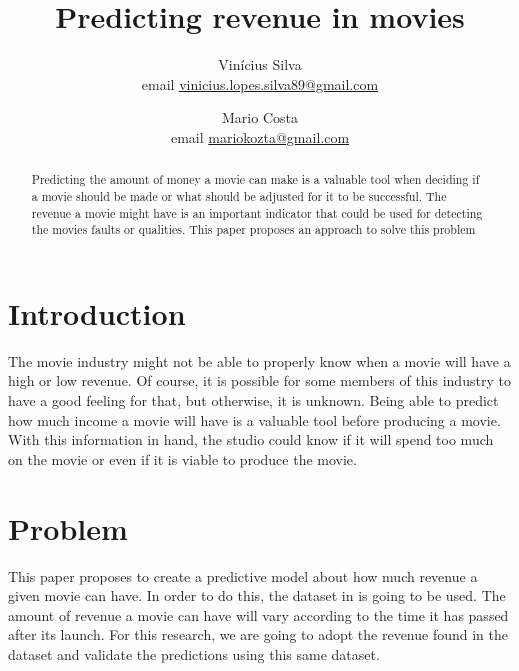 \documentclass[10pt,twocolumn,letterpaper]{article}
\begin{document}
\title{Predicting revenue in movies}
\author{Vin\'{i}cius Silva \\ email         \href{vinicius.lopes.silva89@gmail.com}{vinicius.lopes.silva89@gmail.com} 
\\ \and
Mario Costa \\ email \href{mariokozta@gmail.com}{mariokozta@gmail.com}
}

\maketitle
\begin{abstract}
Predicting the amount of money a movie can make is a valuable tool when deciding if a movie should be made or what should be adjusted for it to be successful. The revenue a movie might have is an important indicator that could be used for detecting the movies faults or qualities. This paper proposes an approach to solve this problem
\end{abstract}

\section{Introduction}
The movie industry might not be able to properly know when a movie will have a high or low revenue. Of course, it is possible for some members of this industry to have a good feeling for that, but otherwise, it is unknown. Being able to predict how much income a movie will have is a valuable tool before producing a movie. With this information in hand, the studio could know if it will spend too much on the movie or even if it is viable to produce the movie. 

\section{Problem}
This paper proposes to create a predictive model about how much revenue a given movie can have. In order to do this, the dataset in \cite{dataset} is going to be used. The amount of revenue a movie can have will vary according to the time it has passed after its launch. For this research, we are going to adopt the revenue found in the dataset and validate the predictions using this same dataset.
\end{document}
